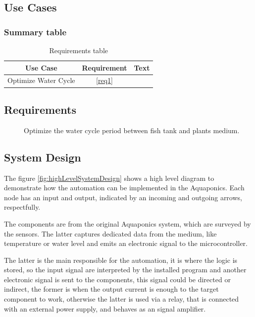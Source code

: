 \subsection{Use Cases}
\label{sec:useCases}


\subsubsection{Summary table}

\begin{table}[h]
\centering
\caption{Requirements table}
\label{tab:requirementsTable}
\begin{tabular}{|c|c|c|}
\hline
\textbf{Use Case}    & \textbf{Requirement} & \textbf{Text} \\ \hline
Optimize Water Cycle & \ref{req1}           &                 \\ \hline
\end{tabular}
\end{table}

\subsection{Requirements}
\label{sec:requirements}

\begin{description}

\item []
Optimize the water cycle period between fish tank and plants medium.

\end{description}

\subsection{System Design}
\label{sec:design}

The figure \ref{fig:highLevelSystemDesign} shows a high level diagram to demonstrate how the automation can be implemented in the Aquaponics.
Each node has an input and output,
indicated by an incoming and outgoing arrows, respectfully.

The components are from the original Aquaponics system,
which are surveyed by the sensors.
The latter captures dedicated data from the medium,
like temperature or water level and emits an electronic signal to the microcontroller.

The latter is the main responsible for the automation,
it is where the logic is stored,
so the input signal are interpreted by the installed program and another electronic signal is sent to the components,
this signal could be directed or indirect,
the former is when the output current is enough to the target component to work,
otherwise the latter is used via a relay,
that is connected with an external power supply,
and behaves as an signal amplifier.


